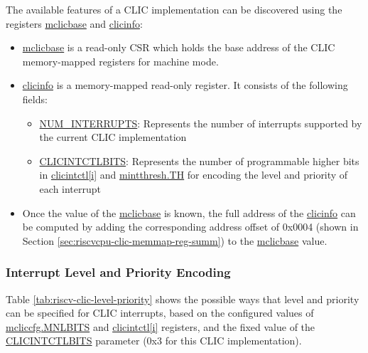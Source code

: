 \documentclass[main\_\_EN.tex]{subfiles}
\begin{document}
The available features of a CLIC implementation can be discovered using the registers \hyperref[regdesc:MCLICBASE_REG]{mclicbase}
and \hyperref[regdesc:CLICINFO_REG]{clicinfo}:
\begin{itemize}
    \item \hyperref[regdesc:MCLICBASE_REG]{mclicbase} is a read-only CSR which holds the base address of the CLIC memory-mapped registers for machine mode.
    \item \hyperref[regdesc:CLICINFO_REG]{clicinfo} is a memory-mapped read-only register. It consists of the following fields:
    \begin{itemize}
        \item \hyperref[fielddesc:CLICINFO_NUM_INTERRUPTS]{NUM\_INTERRUPTS}: Represents the number of interrupts supported by the current CLIC implementation
        \item \hyperref[fielddesc:CLICINFO_CLICINTCTLBITS]{CLICINTCTLBITS}: Represents the number of programmable higher bits in \hyperref[regdesc:MCLICINTCTL_REG_i]{clicintctl[i]} and \hyperref[fielddesc:MINTTHRESH_TH]{{mintthresh.TH}} for encoding the level and priority of each interrupt
    \end{itemize}
    \item Once the value of the \hyperref[fielddesc:MCLICBASE]{mclicbase} is known, the full address of the  \hyperref[regdesc:CLICINFO_REG]{clicinfo} can be computed by adding the corresponding address offset of 0x0004 (shown in Section \ref{sec:riscvcpu-clic-memmap-reg-summ}) to the \hyperref[fielddesc:MCLICBASE]{mclicbase} value.
\end{itemize}


\hypertarget{riscvcpu-clic-int-level-prio}{}
\subsubsection{Interrupt Level and Priority Encoding}
\label{sec:riscvcpu-clic-int-level-prio}

Table \ref{tab:riscv-clic-level-priority} shows the possible ways that level and priority can be specified for CLIC interrupts, based on the configured values of \hyperref[fielddesc:MCLICCFG_MNLBITS]{mcliccfg.MNLBITS}
and \hyperref[regdesc:MCLICINTCTL_REG_i]{clicintctl[i]} registers, and the fixed value of the \hyperref[fielddesc:CLICINFO_CLICINTCTLBITS]{CLICINTCTLBITS} parameter (0x3 for this CLIC implementation).
\end{document}
